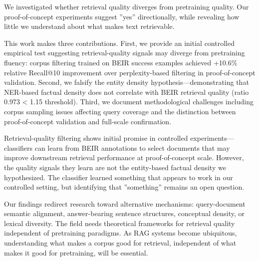 
We investigated whether retrieval quality diverges from pretraining quality. Our proof-of-concept experiments suggest ''yes'' directionally, while revealing how little we understand about what makes text retrievable.

This work makes three contributions. First, we provide an initial controlled empirical test suggesting retrieval-quality signals may diverge from pretraining fluency: corpus filtering trained on BEIR success examples achieved +10.6\% relative Recall@10 improvement over perplexity-based filtering in proof-of-concept validation. Second, we falsify the entity density hypothesis---demonstrating that NER-based factual density does not correlate with BEIR retrieval quality (ratio 0.973 < 1.15 threshold). Third, we document methodological challenges including corpus sampling issues affecting query coverage and the distinction between proof-of-concept validation and full-scale confirmation.

Retrieval-quality filtering shows initial promise in controlled experiments---classifiers can learn from BEIR annotations to select documents that may improve downstream retrieval performance at proof-of-concept scale. However, the quality signals they learn are not the entity-based factual density we hypothesized. The classifier learned something that appears to work in our controlled setting, but identifying that ''something'' remains an open question.

Our findings redirect research toward alternative mechanisms: query-document semantic alignment, answer-bearing sentence structures, conceptual density, or lexical diversity. The field needs theoretical frameworks for retrieval quality independent of pretraining paradigms. As RAG systems become ubiquitous, understanding what makes a corpus good for retrieval, independent of what makes it good for pretraining, will be essential.
